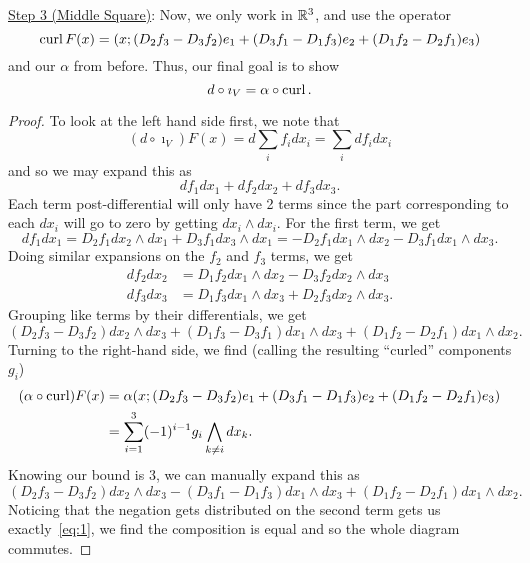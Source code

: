 \documentclass{article}
\begin{document}
\underline{Step 3 (Middle Square)}:
Now, we only work in $\RR[3]$, and use the operator
\[ \curl F(x) = (x; (D_{2}f_{3} - D_{3}f_{2})e_{1} + (D_{3}f_{1} - D_{1}f_{3})e_{2} + (D_{1}f_{2} - D_{2}f_{1})e_{3}) \]
and our $\alpha$ from before. Thus, our final goal is to show
\[ d \circ \imath_{V} = \alpha \circ \curl. \]
\begin{proof}
  To look at the left hand side first, we note that
  \[ (d \circ \imath_{V})F(x) = d\sum_{i}f_{i}dx_{i} = \sum_{i}df_{i}dx_{i} \]
  and so we may expand this as
  \[ df_{1}dx_{1} + df_{2}dx_{2} + df_{3}dx_{3}. \]
  Each term post-differential will only have 2 terms since the part corresponding to each $dx_{i}$ will go to zero by getting $dx_{i} \wedge dx_{i}$.
  For the first term, we get
  \[ df_{1}dx_{1} = D_{2}f_{1} dx_{2} \wedge dx_{1} + D_{3}f_{1} dx_{3} \wedge dx_{1} = - D_{2}f_{1} dx_{1} \wedge dx_{2} - D_{3}f_{1} dx_{1} \wedge dx_{3}. \]
  Doing similar expansions on the $f_{2}$ and $f_{3}$ terms, we get
  \begin{align*}
    df_{2}dx_{2} &= D_{1}f_{2} dx_{1} \wedge dx_{2} - D_{3}f_{2} dx_{2} \wedge dx_{3}\\
    df_{3}dx_{3} &= D_{1}f_{3} dx_{1} \wedge dx_{3} + D_{2}f_{3} dx_{2} \wedge dx_{3}.
  \end{align*}
  Grouping like terms by their differentials, we get
  \begin{equation}\label{eq:1} (D_{2}f_{3} - D_{3}f_{2}) dx_{2} \wedge dx_{3} + (D_{1}f_{3} - D_{3}f_{1}) dx_{1} \wedge dx_{3} + (D_{1}f_{2} - D_{2}f_{1}) dx_{1} \wedge dx_{2}. \end{equation}
  Turning to the right-hand side, we find (calling the resulting ``curled'' components $g_{i}$)
  \begin{align*}
    (\alpha \circ \curl)F(x) &= \alpha(x; (D_{2}f_{3} - D_{3}f_{2})e_{1} + (D_{3}f_{1} - D_{1}f_{3})e_{2} + (D_{1}f_{2} - D_{2}f_{1})e_{3})\\
                    &= \sum_{i = 1}^{3} \pars{-1}^{i - 1} g_{i} \bigwedge_{k \ne i}dx_{k}.
  \end{align*}
  Knowing our bound is 3, we can manually expand this as
  \[ (D_{2}f_{3} - D_{3}f_{2}) dx_{2} \wedge dx_{3} - (D_{3}f_{1} - D_{1}f_{3}) dx_{1} \wedge dx_{3} + (D_{1}f_{2} - D_{2}f_{1}) dx_{1} \wedge dx_{2}. \]
  Noticing that the negation gets distributed on the second term gets us exactly~\eqref{eq:1}, we find the composition is equal and so the whole diagram commutes.
\end{proof}
\end{document}
